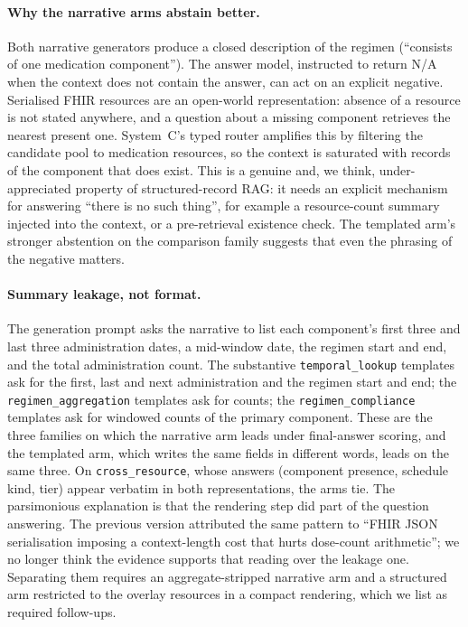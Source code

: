 \paragraph{Why the narrative arms abstain better.}
Both narrative generators produce a closed description of the regimen (``consists of one
medication component'').  The answer model, instructed to return N/A when the context does
not contain the answer, can act on an explicit negative.  Serialised FHIR resources are an
open-world representation: absence of a resource is not stated anywhere, and a question
about a missing component retrieves the nearest present one.  System~C's typed router
amplifies this by filtering the candidate pool to medication resources, so the context is
saturated with records of the component that does exist.  This is a genuine and, we think,
under-appreciated property of structured-record RAG: it needs an explicit mechanism for
answering ``there is no such thing'', for example a resource-count summary injected into
the context, or a pre-retrieval existence check.  The templated arm's stronger abstention
on the comparison family suggests that even the phrasing of the negative matters.

\paragraph{Summary leakage, not format.}
The generation prompt asks the narrative to list each component's first three and last
three administration dates, a mid-window date, the regimen start and end, and the total
administration count.  The substantive \texttt{temporal\_lookup} templates ask for the
first, last and next administration and the regimen start and end; the
\texttt{regimen\_aggregation} templates ask for counts; the \texttt{regimen\_compliance}
templates ask for windowed counts of the primary component.  These are the three families
on which the narrative arm leads under final-answer scoring, and the templated arm, which
writes the same fields in different words, leads on the same three.  On
\texttt{cross\_resource}, whose answers (component presence, schedule kind, tier) appear
verbatim in both representations, the arms tie.  The parsimonious explanation is that the
rendering step did part of the question answering.  The previous version attributed the
same pattern to ``FHIR JSON serialisation imposing a context-length cost that hurts
dose-count arithmetic''; we no longer think the evidence supports that reading over the
leakage one.  Separating them requires an aggregate-stripped narrative arm and a
structured arm restricted to the overlay resources in a compact rendering, which we list
as required follow-ups.

